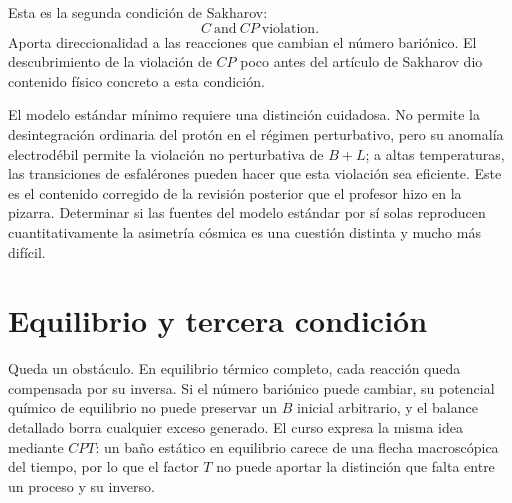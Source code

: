 \begin{classroomqa}
\end{classroomqa}

Esta es la segunda condición de Sakharov:
\begin{equation}
\boxed{C\ \text{and}\ CP\ \text{violation}.}
\end{equation}
Aporta direccionalidad a las reacciones que cambian el número bariónico. El descubrimiento de la violación de \(CP\) poco antes del artículo de Sakharov dio contenido físico concreto a esta condición.

El modelo estándar mínimo requiere una distinción cuidadosa. No permite la desintegración ordinaria del protón en el régimen perturbativo, pero su anomalía electrodébil permite la violación no perturbativa de \(B+L\); a altas temperaturas, las transiciones de esfalérones pueden hacer que esta violación sea eficiente. Este es el contenido corregido de la revisión posterior que el profesor hizo en la pizarra. Determinar si las fuentes del modelo estándar por sí solas reproducen cuantitativamente la asimetría cósmica es una cuestión distinta y mucho más difícil.

\section{Equilibrio y tercera condición}

Queda un obstáculo. En equilibrio térmico completo, cada reacción queda compensada por su inversa. Si el número bariónico puede cambiar, su potencial químico de equilibrio no puede preservar un \(B\) inicial arbitrario, y el balance detallado borra cualquier exceso generado. El curso expresa la misma idea mediante \(CPT\): un baño estático en equilibrio carece de una flecha macroscópica del tiempo, por lo que el factor \(T\) no puede aportar la distinción que falta entre un proceso y su inverso.

